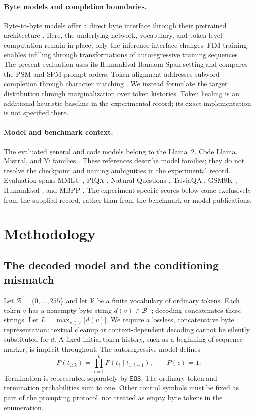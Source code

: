 \documentclass{article}
\newcommand{\bytes}{\mathcal{B}}
\newcommand{\vocab}{\mathcal{V}}
\newcommand{\decode}{d}
\newcommand{\eos}{\mathtt{EOS}}
\newcommand{\emptyseq}{\epsilon}
\begin{document}
\paragraph{Byte models and completion boundaries.}
Byte-to-byte models offer a direct byte interface through their pretrained architecture \citep{xue2022}. Here, the underlying network, vocabulary, and token-level computation remain in place; only the inference interface changes. FIM training enables infilling through transformations of autoregressive training sequences \citep{bavarian2022}. The present evaluation uses its HumanEval Random Span setting and compares the PSM and SPM prompt orders. Token alignment addresses subword completion through character matching \citep{athiwaratkun2024}. We instead formulate the target distribution through marginalization over token histories. Token healing is an additional heuristic baseline in the experimental record; its exact implementation is not specified there.

\paragraph{Model and benchmark context.}
The evaluated general and code models belong to the Llama~2, Code Llama, Mistral, and Yi families \citep{touvron2023,roziere2023,jiang2023,young2024}. These references describe model families; they do not resolve the checkpoint and naming ambiguities in the experimental record. Evaluation spans MMLU \citep{hendrycks2021}, PIQA \citep{bisk2020}, Natural Questions \citep{kwiatkowski2019}, TriviaQA \citep{joshi2017}, GSM8K \citep{cobbe2021}, HumanEval \citep{chen2021}, and MBPP \citep{austin2021}. The experiment-specific scores below come exclusively from the supplied record, rather than from the benchmark or model publications.

\section{Methodology}
\label{sec:method}
\subsection{The decoded model and the conditioning mismatch}
\label{sec:process}
Let $\bytes=\{0,\ldots,255\}$ and let $\vocab$ be a finite vocabulary of ordinary tokens. Each token $v$ has a nonempty byte string $\decode(v)\in\bytes^+$; decoding concatenates these strings. Let $L=\max_{v\in\vocab}|\decode(v)|$. We require a lossless, concatenative byte representation: textual cleanup or context-dependent decoding cannot be silently substituted for $\decode$. A fixed initial token history, such as a beginning-of-sequence marker, is implicit throughout. The autoregressive model defines
\begin{equation}
 P(t_{1:k})=\prod_{i=1}^{k}P(t_i\mid t_{1:i-1}),
 \qquad P(\emptyseq)=1.
 \label{eq:tokenprob}
\end{equation}
Termination is represented separately by $\eos$. The ordinary-token and termination probabilities sum to one. Other control symbols must be fixed as part of the prompting protocol, not treated as empty byte tokens in the enumeration.
\end{document}
